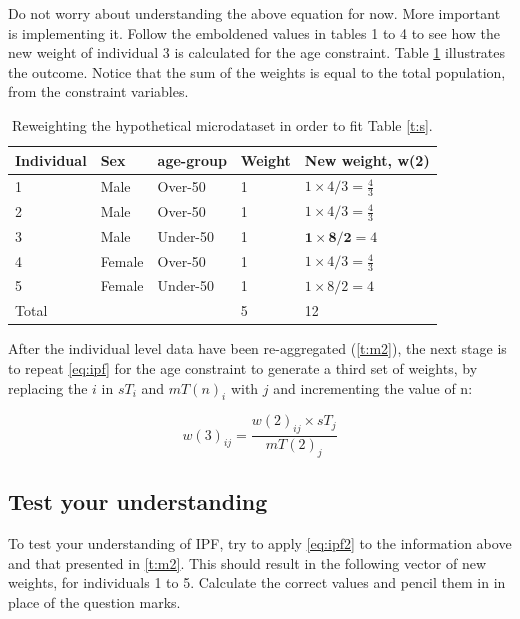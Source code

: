 \documentclass[a4paper, 11pt, twoside]{article}
\begin{document}
Do not worry about understanding the above equation for now.
More important is implementing it. Follow the emboldened values in tables 1 to 4
to see how the new weight of individual 3 is calculated for the age constraint.
Table \ref{t:new-weights} illustrates the outcome. Notice that the
sum of the weights is equal to the total population, from the constraint variables.

\begin{table}[htbp]
\centering
\caption{Reweighting the hypothetical microdataset in order to fit
Table \ref{t:s}.}
\begin{tabular}{lllll}
\toprule
{Individual} & {Sex} & {age-group} & {Weight} &
{New weight, w(2)} \\ \midrule
1 & Male & Over-50 & 1 & $1 \times 4/3 = \frac{4}{3}$ \\
2 & Male & Over-50 & 1 & $1 \times 4/3 = \frac{4}{3}$ \\
3 & Male & Under-50 & 1 & $\textbf{1} \times
\textbf{8}/\textbf{2} = 4$ \\
4 & Female & Over-50 & 1 & $1 \times 4/3 = \frac{4}{3}$ \\
5 & Female & Under-50 & 1 & $1 \times 8/2 = 4$ \\
\midrule
Total & & & 5 & 12 \\
\bottomrule
\end{tabular}
\label{t:new-weights}
\end{table}

After the individual level data have been re-aggregated (\cref{t:m2}),
the next stage is to repeat \cref{eq:ipf} for the age constraint to generate a
third set of weights, by replacing
the $i$ in $sT_{i}$ and $mT(n)_{i}$ with $j$ and incrementing the value of n:

\begin{equation}
w(3)_{ij} = \frac{w(2)_{ij} \times sT_{j}}{mT(2)_{j}}
\label{eq:ipf2}
\end{equation}

\subsection{Test your understanding}
To test your understanding of IPF, try to apply \cref{eq:ipf2} to the
information above
and that presented in \cref{t:m2}.
This should result in the following vector of new weights, for individuals 1 to
5. Calculate the correct values and pencil them in in place of the question
marks.  %
\end{document}
